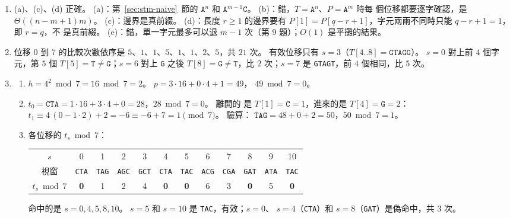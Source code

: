 \begin{enumerate}
\item (a)、(c)、(d) 正確。 (a)：第~\ref{sec:stm-naive}~節的 $\mathtt{A}^n$ 和
$\mathtt{A}^{m-1}\mathtt{C}$。 (b)：錯，$T = \mathtt{A}^n$、$P = \mathtt{A}^m$ 時每
個位移都要逐字確認，是 $\Theta((n - m + 1)m)$。 (c)：邊界是真前綴。 (d)：長度 $r \ge 1$
的邊界要有 $P[1] = P[q - r + 1]$，字元兩兩不同時只能 $q - r + 1 = 1$，即 $r = q$，不
是真前綴。 (e)：錯，單一字元最多可以退 $m - 1$ 次（第 9 題）；$O(1)$
是平攤的結果。

\item 位移 $0$ 到 $7$ 的比較次數依序是 $5$、$1$、$1$、$5$、$1$、$1$、$2$、$5$，共 $21$ 次。 有效位移只有
$s = 3$（$T[4..8] = \mathtt{GTAGG}$）。 $s = 0$ 對上前 $4$ 個字元，第 $5$ 個
$T[5] = \mathtt{T} \ne \mathtt{G}$；$s = 6$ 對上 \texttt{G} 之後 $T[8] = \mathtt{G}
\ne \mathtt{T}$，比 $2$ 次；$s = 7$ 是 \texttt{GTAGT}，前 $4$ 個相同，比 $5$ 次。

\item
\begin{enumerate}
\item $h = 4^2 \bmod 7 = 16 \bmod 7 = 2$。 $p = 3 \cdot 16 + 0 \cdot 4 + 1 = 49$，
$49 \bmod 7 = 0$。
\item $t_0 = \mathtt{CTA} = 1 \cdot 16 + 3 \cdot 4 + 0 = 28$，$28 \bmod 7 = 0$。 離開的
是 $T[1] = \mathtt{C} = 1$，進來的是 $T[4] = \mathtt{G} = 2$：
$t_1 \equiv 4\,(0 - 1 \cdot 2) + 2 = -6 \equiv -6 + 7 = 1 \pmod 7$。 驗算：
$\mathtt{TAG} = 48 + 0 + 2 = 50$，$50 \bmod 7 = 1$。
\item 各位移的 $t_s \bmod 7$：
\begin{center}
\small
\begin{tabular}{c*{11}{c}}
\toprule
$s$ & 0 & 1 & 2 & 3 & 4 & 5 & 6 & 7 & 8 & 9 & 10 \\
視窗 & \texttt{CTA} & \texttt{TAG} & \texttt{AGC} & \texttt{GCT} & \texttt{CTA} & \texttt{TAC} & \texttt{ACG} & \texttt{CGA} & \texttt{GAT} & \texttt{ATA} & \texttt{TAC} \\
$t_s \bmod 7$ & \textbf{0} & 1 & 2 & 4 & \textbf{0} & \textbf{0} & 6 & 3 & \textbf{0} & 5 & \textbf{0} \\
\bottomrule
\end{tabular}
\end{center}
命中的是 $s = 0, 4, 5, 8, 10$。 $s = 5$ 和 $s = 10$ 是 \texttt{TAC}，有效；$s = 0$、
$s = 4$（\texttt{CTA}）和 $s = 8$（\texttt{GAT}）是偽命中，共 $3$ 次。
\end{enumerate}


\end{enumerate}
